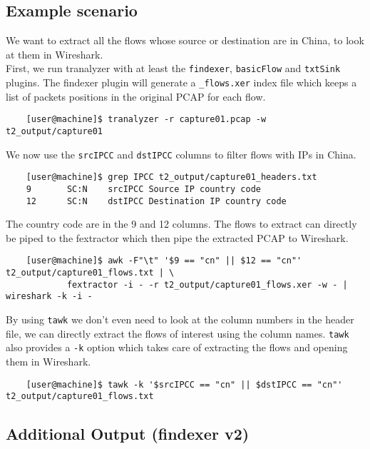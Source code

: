 \documentclass[documentation]{subfiles}
\begin{document}
\subsection{Example scenario}

We want to extract all the flows whose source or destination are in China, to look at them in Wireshark.\\

First, we run tranalyzer with at least the {\tt findexer}, {\tt basicFlow} and {\tt txtSink} plugins.
The findexer plugin will generate a {\tt \_flows.xer} index file which keeps a list of packets positions
in the original PCAP for each flow.

    \begin{verbatim}
    [user@machine]$ tranalyzer -r capture01.pcap -w t2_output/capture01
    \end{verbatim}

We now use the {\tt srcIPCC} and {\tt dstIPCC} columns to filter flows with IPs in China.

    \begin{verbatim}
    [user@machine]$ grep IPCC t2_output/capture01_headers.txt
    9       SC:N    srcIPCC Source IP country code
    12      SC:N    dstIPCC Destination IP country code
    \end{verbatim}

The country code are in the 9 and 12 columns. The flows to extract can directly be
piped to the fextractor which then pipe the extracted PCAP to Wireshark.

{\small
    \begin{verbatim}
    [user@machine]$ awk -F"\t" '$9 == "cn" || $12 == "cn"' t2_output/capture01_flows.txt | \
            fextractor -i - -r t2_output/capture01_flows.xer -w - | wireshark -k -i -
    \end{verbatim}
}

By using {\tt tawk} we don't even need to look at the column numbers in the header file, we can directly
extract the flows of interest using the column names. {\tt tawk} also provides a {\tt -k} option
which takes care of extracting the flows and opening them in Wireshark.

{\small
    \begin{verbatim}
    [user@machine]$ tawk -k '$srcIPCC == "cn" || $dstIPCC == "cn"' t2_output/capture01_flows.txt
    \end{verbatim}
}


\subsection{Additional Output (findexer v2)}
\end{document}

